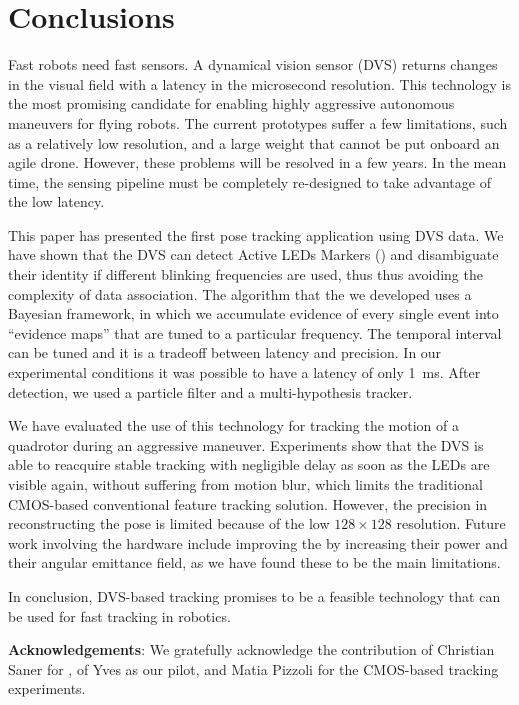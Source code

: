 
\section{Conclusions\label{sec:conclusion}}

Fast robots need fast sensors. A dynamical vision sensor (DVS) returns
changes in the visual field with a latency in the microsecond resolution.
This technology is the most promising candidate for enabling highly
aggressive autonomous maneuvers for flying robots. The current prototypes
suffer a few limitations, such as a relatively low resolution, and
a large weight that cannot be put onboard an agile drone. However,
these problems will be resolved in a few years. In the mean time,
the sensing pipeline must be completely re-designed to take advantage
of the low latency.

This paper has presented the first pose tracking application using
DVS data. We have shown that the DVS can detect Active LEDs Markers
(\ALMs) and disambiguate their identity if different blinking frequencies
are used, thus thus avoiding the complexity of data association. The
algorithm that the we developed uses a Bayesian framework, in which
we accumulate evidence of every single event into ``evidence maps''
that are tuned to a particular frequency. The temporal interval can
be tuned and it is a tradeoff between latency and precision. In our
experimental conditions it was possible to have a latency of only
1~ms. After detection, we used a particle filter and a multi-hypothesis
tracker. 

We have evaluated the use of this technology for tracking the motion
of a quadrotor during an aggressive maneuver. Experiments show that
the DVS is able to reacquire stable tracking with negligible delay
as soon as the LEDs are visible again, without suffering from motion
blur, which limits the traditional CMOS-based conventional feature
tracking solution. However, the precision in reconstructing the pose
is limited because of the low $128\times128$ resolution. Future work
involving the hardware include improving the \ALMs by increasing
their power and their angular emittance field, as we have found these
to be the main limitations.

In conclusion, DVS-based \ALM tracking promises to be a feasible
technology that can be used for fast tracking in robotics.







\textbf{Acknowledgements}: We gratefully acknowledge the contribution
of Christian Saner for \xxx, of Yves \xxx as our pilot, and Matia
Pizzoli for the CMOS-based tracking experiments.
